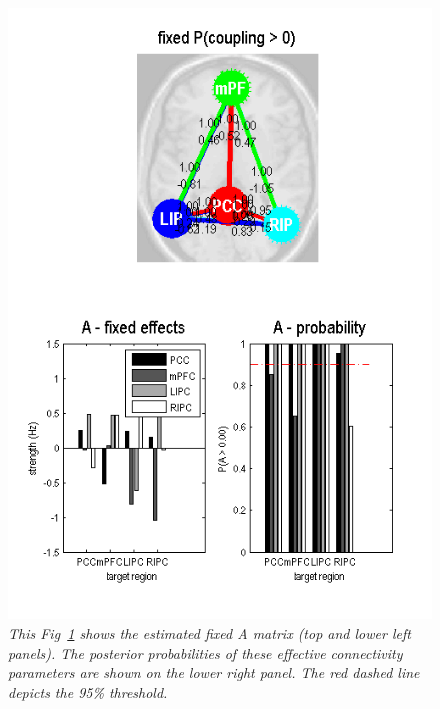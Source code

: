 \begin{figure}[ht]
\begin{center}
\includegraphics[width=140mm]{dcm_rs/Fig3}
\caption{\em This Fig~\ref{spdcm_Fig3} shows the estimated fixed A matrix (top and lower left panels). The posterior probabilities of these effective connectivity parameters are shown on the lower right panel. The red dashed line depicts the 95\% threshold.
\label{spdcm_Fig3}}
\end{center}
\end{figure}
